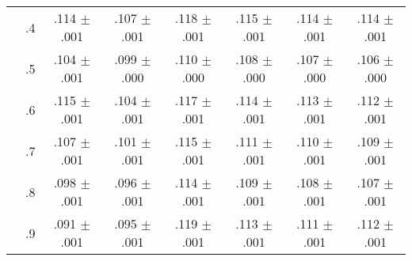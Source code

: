\begin{tabular}{cccccccc}
 & .4 & .114 $\pm$ .001 & .107 $\pm$ .001 & .118 $\pm$ .001 & .115 $\pm$ .001 & .114 $\pm$ .001 & .114 $\pm$ .001 \\
 & .5 & .104 $\pm$ .001 & .099 $\pm$ .000 & .110 $\pm$ .000 & .108 $\pm$ .000 & .107 $\pm$ .000 & .106 $\pm$ .000 \\
 & .6 & .115 $\pm$ .001 & .104 $\pm$ .001 & .117 $\pm$ .001 & .114 $\pm$ .001 & .113 $\pm$ .001 & .112 $\pm$ .001 \\
 & .7 & .107 $\pm$ .001 & .101 $\pm$ .001 & .115 $\pm$ .001 & .111 $\pm$ .001 & .110 $\pm$ .001 & .109 $\pm$ .001 \\
 & .8 & .098 $\pm$ .001 & .096 $\pm$ .001 & .114 $\pm$ .001 & .109 $\pm$ .001 & .108 $\pm$ .001 & .107 $\pm$ .001 \\
 & .9 & .091 $\pm$ .001 & .095 $\pm$ .001 & .119 $\pm$ .001 & .113 $\pm$ .001 & .111 $\pm$ .001 & .112 $\pm$ .001 \\
\bottomrule
\end{tabular}